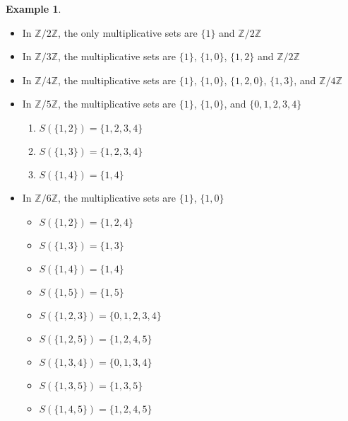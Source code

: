 \documentclass[a4paper]{book}
\theoremstyle{definition}
\newtheorem{example}{Example}[definition]
\begin{document}
\begin{example}
    \begin{itemize}
        \item In \(\mathbb{Z} / 2 \mathbb{Z}\), the only multiplicative sets are \(\{1\}\) and \(\mathbb{Z} / 2 \mathbb{Z}\)
        

        \item In \(\mathbb{Z} / 3 \mathbb{Z}\), the multiplicative sets are \(\{1\}\), \(\{1, 0\}\), \(\{1, 2\}\) and \(\mathbb{Z} / 2 \mathbb{Z}\)
        
        
        \item In \(\mathbb{Z} / 4 \mathbb{Z}\), the multiplicative sets are \(\{1\}\), \(\{1, 0\}\), \(\{1, 2, 0\}\), \(\{1, 3\}\), and \(\mathbb{Z} / 4 \mathbb{Z}\)
        
        
        \item In \(\mathbb{Z} / 5 \mathbb{Z}\), the multiplicative sets are \(\{1\}\), \(\{1, 0\}\), and \(\{0, 1, 2, 3, 4\}\)
        \begin{enumerate}
            \item \(S(\{1, 2\}) = \{1, 2, 3, 4\}\)
            \item \(S(\{1, 3\}) = \{1, 2, 3, 4\}\)
            \item \(S(\{1, 4\}) = \{1, 4\}\)
        \end{enumerate}

        \item In \(\mathbb{Z} / 6 \mathbb{Z}\), the multiplicative sets are \(\{1\}\), \(\{1, 0\}\)
        \begin{itemize}
            \item \(S(\{1, 2\}) = \{1, 2, 4\}\)
            \item \(S(\{1, 3\}) = \{1, 3\}\)
            \item \(S(\{1, 4\}) = \{1, 4\}\)
            \item \(S(\{1, 5\}) = \{1, 5\}\)
            \item \(S(\{1, 2, 3\}) = \{0, 1, 2, 3, 4\}\)
            \item \(S(\{1, 2, 5\}) = \{1, 2, 4, 5\}\)
            \item \(S(\{1, 3, 4\}) = \{0, 1, 3, 4\}\)
            \item \(S(\{1, 3, 5\}) = \{1, 3, 5\}\)
            \item \(S(\{1, 4, 5\}) = \{1, 2, 4, 5\}\)
        \end{itemize}


\end{itemize}
\end{example}
\end{document}
